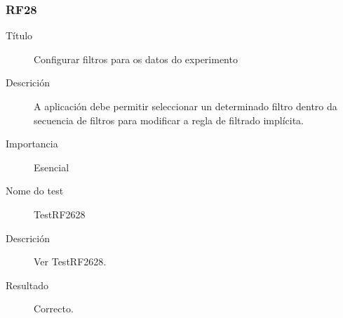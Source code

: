 \subsubsection*{RF28}
\begin{description}
\item[Título] \hfill
Configurar filtros para os datos do experimento
\item[Descrición] \hfill
A aplicación debe permitir seleccionar un determinado filtro dentro da secuencia de filtros para modificar a regla de filtrado implícita.
\item[Importancia] \hfill
Esencial
\item[Nome do test] \hfill
TestRF2628
\item[Descrición]
Ver TestRF2628.
\item[Resultado]
Correcto.
\end{description}

